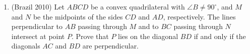 \documentclass[10pt]{article}
\theoremstyle{definition}
\theoremstyle{remark}
\begin{document}
\begin{enumerate}
\item (Brazil 2010) Let $ABCD$ be a convex quadrilateral with $\angle B \neq 90^\circ$, and $M$ and $N$ be the midpoints of the sides $CD$ and $AD$, respectively. The lines perpendicular to $AB$ passing through $M$ and to $BC$ passing through $N$ intersect at point $P$. Prove that $P$ lies on the diagonal $BD$ if and only if the diagonals $AC$ and $BD$ are perpendicular.

\end{enumerate}
\end{document}
